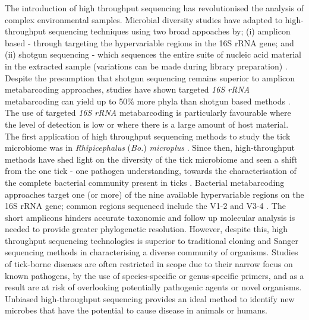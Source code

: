 \documentclass[a4paper, nobind]{templates/ociamthesis}
\begin{document}
The introduction of high throughput sequencing has revolutionised the analysis of complex environmental samples.
Microbial diversity studies have adapted to high-throughput sequencing techniques using two broad appoaches by; (i) amplicon based - through targeting the hypervariable regions in the 16S rRNA gene; and (ii) shotgun sequencing - which sequences the entire suite of nucleic acid material in the extracted sample (variations can be made during library preparation) \autocite{liuPracticalGuideAmplicon2020,bhartiCurrentChallengesBestpractice2021}.
Despite the presumption that shotgun sequencing remains superior to amplicon metabarcoding approaches, studies have shown targeted \emph{16S rRNA} metabarcoding can yield up to 50\% more phyla than shotgun based methods \autocite{tesslerLargescaleDifferencesMicrobial2017}.
The use of targeted \emph{16S rRNA} metabarcoding is particularly favourable where the level of detection is low or where there is a large amount of host material.
The first application of high throughput sequencing methods to study the tick microbiome was in \emph{Rhipicephalus} (\emph{Bo.}) \emph{microplus} \autocite{andreottiAssessmentBacterialDiversity2011}.
Since then, high-throughput methods have shed light on the diversity of the tick microbiome \autocite{greayRecentInsightsTick2018} and seen a shift from the one tick - one pathogen understanding, towards the characterisation of the complete bacterial community present in ticks \autocite{moutaillerCoinfectionTicksRule2016}.
Bacterial metabarcoding approaches target one (or more) of the nine available hypervariable regions on the 16S rRNA gene; common regions sequenced include the V1-2 and V3-4 \autocite{barbDevelopmentAnalysisPipeline2016,yangSensitivityCorrelationHypervariable2016,sperlingComparisonBacterial16S2017}.
The short amplicons hinders accurate taxonomic and follow up molecular analysis is needed to provide greater phylogenetic resolution.
However, despite this, high throughput sequencing technologies is superior to traditional cloning and Sanger sequencing methods in characterising a diverse community of organisms.
Studies of tick-borne diseases are often restricted in scope due to their narrow focus on known pathogens, by the use of species-specific or genus-specific primers, and as a result are at risk of overlooking potentially pathogenic agents or novel organisms.
Unbiased high-throughput sequencing provides an ideal method to identify new microbes that have the potential to cause disease in animals or humans.
\end{document}
